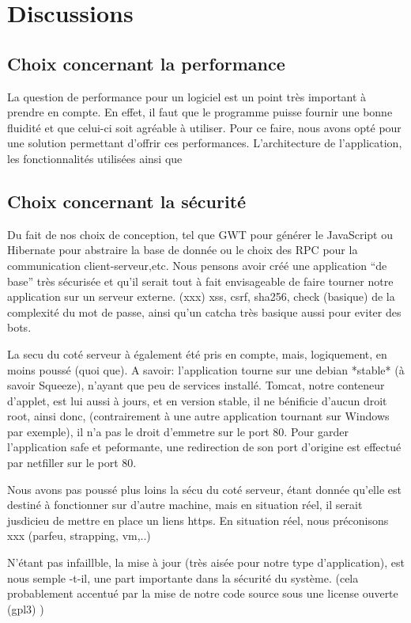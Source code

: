 \chapter{Discussions}
\section{Choix concernant la performance}
La question de performance pour un logiciel est un point très important à prendre en compte. En effet, il faut que le programme puisse fournir une bonne fluidité et que celui-ci soit agréable à utiliser. Pour ce faire, nous avons opté pour une solution permettant d'offrir ces performances. L'architecture de l'application, les fonctionnalités utilisées ainsi que 

\section{Choix concernant la sécurité}

Du fait de nos choix de conception, tel que GWT pour générer le JavaScript ou
Hibernate pour abstraire la base de donnée ou le choix des RPC pour la
communication client-serveur,etc.  Nous pensons avoir créé une application \enquote{de
base} très sécurisée  et qu'il serait tout à fait envisageable de faire tourner notre
application sur un serveur externe.
(xxx) xss, csrf, sha256, check (basique) de la complexité du mot de passe, ainsi
qu'un catcha très basique aussi pour eviter des bots.

La secu du coté serveur à également été pris en compte, mais, logiquement, en
moins poussé (quoi que).  A savoir: l'application tourne sur une debian *stable*
(à savoir Squeeze), n'ayant que peu de services installé.
Tomcat, notre conteneur d'applet, est lui aussi à jours, et en version stable,
il ne bénificie d'aucun droit root, ainsi donc, (contrairement à une autre
application tournant sur Windows par exemple), il n'a pas le droit d'emmetre sur
le port 80. Pour garder l'application safe et peformante, une redirection de
son port d'origine est effectué par netfiller sur le port 80.

Nous avons pas poussé plus loins la sécu du coté serveur, étant donnée qu'elle
est destiné à fonctionner sur d'autre machine, mais en situation réel, il serait
jusdicieu de mettre en place un liens https.  En situation réel, nous
préconisons xxx (parfeu, strapping, vm,..)

N'étant pas infaillble, la mise à jour (très aisée pour notre type
d'application), est nous semple -t-il, une part importante dans la sécurité du
système. (cela probablement accentué par la mise de notre code source sous une
license ouverte (gpl3) )
